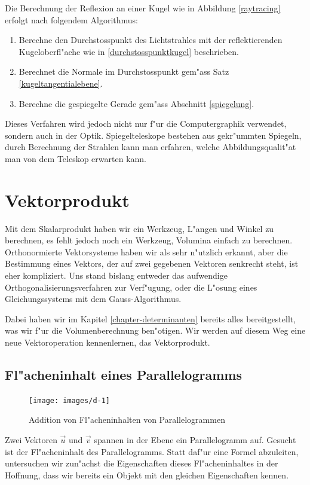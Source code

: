 Die Berechnung der Reflexion an einer Kugel wie in Abbildung \ref{raytracing}
erfolgt nach folgendem Algorithmus:
\begin{enumerate}
\item Berechne den Durchstosspunkt des Lichtstrahles mit der reflektierenden
Kugeloberfl"ache wie in \ref{durchstosspunktkugel} beschrieben.
\item Berechnet die Normale im Durchstosspunkt gem"ass Satz \ref{kugeltangentialebene}.
\item Berechne die gespiegelte Gerade gem"ass Abschnitt \ref{spiegelung}.
\end{enumerate}
Dieses Verfahren wird jedoch nicht nur f"ur die Computergraphik verwendet,
sondern auch in der Optik.
Spiegelteleskope bestehen aus gekr"ummten Spiegeln,
durch Berechnung der Strahlen kann man erfahren, welche Abbildungsqualit"at
man von dem Teleskop erwarten kann.

\section{Vektorprodukt}
Mit dem Skalarprodukt haben wir ein Werkzeug, L"angen und Winkel zu berechnen,
es fehlt jedoch noch ein Werkzeug, Volumina einfach zu berechnen.
Orthonormierte
Vektorsysteme haben wir als sehr n"utzlich erkannt, aber die Bestimmung eines
Vektors, der auf zwei gegebenen Vektoren senkrecht steht, ist eher kompliziert.
Uns stand bislang entweder das
aufwendige Orthogonalisierungsverfahren zur Verf"ugung, oder die L"osung
eines Gleichungssystems mit dem Gauss-Algorithmus.

Dabei haben wir im Kapitel \ref{chapter-determinanten} bereits alles
bereitgestellt, was wir f"ur die Volumenberechnung ben"otigen.
Wir werden auf diesem Weg eine neue Vektoroperation kennenlernen,
das Vektorprodukt.

\subsection{Fl"acheninhalt eines Parallelogramms}
\begin{figure}
\begin{center}
\texttt{[image: images/d-1]}
\end{center}
\caption{Addition von Fl"acheninhalten von Parallelogrammen
\label{image-flaeche-addition}}
\end{figure}
Zwei Vektoren $\vec u$ und $\vec v$ spannen in der Ebene ein Parallelogramm
auf.
Gesucht ist der Fl"acheninhalt des Parallelogramms.
Statt daf"ur eine
Formel abzuleiten, untersuchen wir zun"achst die Eigenschaften dieses
Fl"acheninhaltes in der Hoffnung, dass wir bereits ein Objekt mit den
gleichen Eigenschaften kennen.

